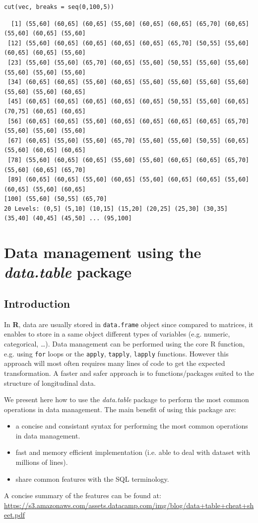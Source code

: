 \documentclass{article}
\newcommand\Rlogo{\textbf{\textsf{R}}\xspace}
\begin{document}
\lstset{language=r,label= ,caption= ,captionpos=b,numbers=none}
\begin{lstlisting}
cut(vec, breaks = seq(0,100,5))
\end{lstlisting}

\begin{verbatim}
  [1] (55,60] (60,65] (60,65] (55,60] (60,65] (60,65] (65,70] (60,65] (55,60] (60,65] (55,60]
 [12] (55,60] (60,65] (60,65] (60,65] (60,65] (65,70] (50,55] (55,60] (60,65] (60,65] (55,60]
 [23] (55,60] (55,60] (65,70] (60,65] (55,60] (50,55] (55,60] (55,60] (55,60] (55,60] (55,60]
 [34] (60,65] (60,65] (55,60] (60,65] (55,60] (55,60] (55,60] (55,60] (55,60] (55,60] (60,65]
 [45] (60,65] (60,65] (60,65] (60,65] (60,65] (50,55] (55,60] (60,65] (70,75] (60,65] (60,65]
 [56] (60,65] (60,65] (55,60] (60,65] (60,65] (60,65] (60,65] (65,70] (55,60] (55,60] (55,60]
 [67] (60,65] (55,60] (55,60] (65,70] (55,60] (55,60] (50,55] (60,65] (55,60] (60,65] (60,65]
 [78] (55,60] (60,65] (60,65] (55,60] (55,60] (60,65] (60,65] (65,70] (55,60] (60,65] (65,70]
 [89] (60,65] (60,65] (55,60] (60,65] (55,60] (60,65] (60,65] (55,60] (60,65] (55,60] (60,65]
[100] (55,60] (50,55] (65,70]
20 Levels: (0,5] (5,10] (10,15] (15,20] (20,25] (25,30] (30,35] (35,40] (40,45] (45,50] ... (95,100]
\end{verbatim}

\section{Data management using the \emph{data.table} package}
\label{sec:org040f0ca}
\subsection{Introduction}
\label{sec:org4de1973}
In \Rlogo, data are usually stored in \texttt{data.frame} object since compared
to matrices, it enables to store in a same object different types of
variables (e.g. numeric, categorical, \ldots{}). Data management can be
performed using the core R function, e.g. using \texttt{for} loops or
the \texttt{apply}, \texttt{tapply}, \texttt{lapply} functions.  However this approach will
most often requires many lines of code to get the expected
transformation.  A faster and safer approach is to functions/packages
suited to the structure of longitudinal data.

\bigskip

We present here how to use the \emph{data.table} package to perform the
most common operations in data management. The main benefit of using
this package are:
\begin{itemize}
\item a concise and consistant syntax for performing the most common
operations in data management.
\item fast and memory efficient implementation (i.e. able to deal with
dataset with millions of lines).
\item share common features with the SQL terminology.
\end{itemize}
A concise summary of the features can be found at:
\url{https://s3.amazonaws.com/assets.datacamp.com/img/blog/data+table+cheat+sheet.pdf}
\end{document}
